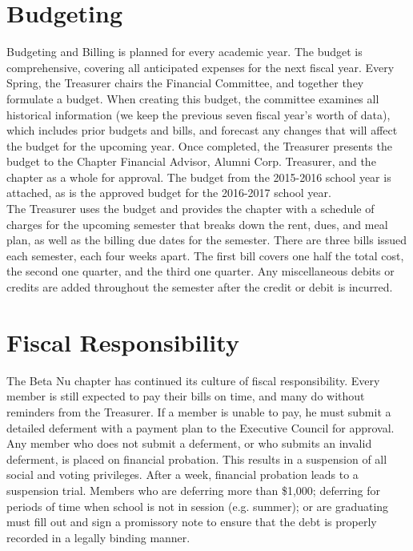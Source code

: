   \section*{Budgeting}
    Budgeting and Billing is planned for every academic year. The budget is comprehensive, covering all anticipated expenses for the next fiscal year. Every Spring, the Treasurer chairs the Financial Committee, and together they formulate a budget. When creating this budget, the committee examines all historical information (we keep the previous seven fiscal year’s worth of data), which includes prior budgets and bills, and forecast any changes that will affect the budget for the upcoming year. Once completed, the Treasurer presents the budget to the Chapter Financial Advisor, Alumni Corp. Treasurer, and the chapter as a whole for approval. The budget from the 2015-2016 school year is attached, as is the approved budget for the 2016-2017 school year. \\

    The Treasurer uses the budget and provides the chapter with a schedule of charges for the upcoming semester that breaks down the rent, dues, and meal plan, as well as the billing due dates for the semester. There are three bills issued each semester, each four weeks apart. The first bill covers one half the total cost, the second one quarter, and the third one quarter. Any miscellaneous debits or credits are added throughout the semester after the credit or debit is incurred.
    
  \section*{Fiscal Responsibility}
  
    The Beta Nu chapter has continued its culture of fiscal responsibility. Every member is still expected to pay their bills on time, and many do without reminders from the Treasurer. If a member is unable to pay, he must submit a detailed deferment with a payment plan to the Executive Council for approval. Any member who does not submit a deferment, or who submits an invalid deferment, is placed on financial probation. This results in a suspension of all social and voting privileges. After a week, financial probation leads to a suspension trial. Members who are deferring more than \$1,000; deferring for periods of time when school is not in session (e.g. summer); or are graduating must fill out and sign a promissory note to ensure that the debt is properly recorded in a legally binding manner. \\

